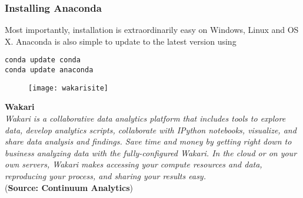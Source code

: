\documentclass[MASTER.tex]{subfiles}
\begin{document}
\begin{frame}[fragile]
\frametitle{Installing Anaconda}
\Large
Most importantly, installation is extraordinarily easy on Windows, Linux
and OS X. Anaconda is also simple to update to the latest version using
\begin{framed}
\begin{verbatim}
conda update conda
conda update anaconda
\end{verbatim}
\end{framed}
\end{frame}


\begin{frame}
	\begin{figure}
\centering
\texttt{[image: wakarisite]}

\end{figure}

\end{frame}
\begin{frame}
\Large
\textbf{Wakari}\\
\textit{
Wakari is a collaborative data analytics platform that includes tools to explore data, develop analytics scripts, collaborate with IPython notebooks, visualize, and share data analysis and findings. Save time and money by getting right down to business analyzing data with the fully-configured Wakari. In the cloud or on your own servers, Wakari makes accessing your compute resources and data, reproducing your process, and sharing your results easy.}\\(\textbf{Source: Continuum Analytics})
\end{frame}
\end{document}
